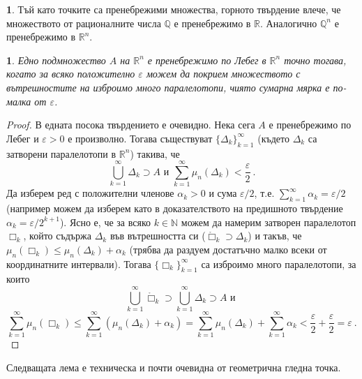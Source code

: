 \documentclass[11pt]{article}
\numberwithin{equation}{section}
\numberwithin{figure}{section}
\numberwithin{table}{section}
\theoremstyle{plain}
\theoremstyle{definition}
\theoremstyle{remark}
\theoremstyle{definition}
\theoremstyle{remark}
\theoremstyle{plain}
\theoremstyle{definition}
\theoremstyle{definition}
\newtheorem{example}[thm]{\protect\examplename}
\theoremstyle{plain}
\theoremstyle{plain}
\newtheorem{prop}[thm]{\protect\propositionname}
\theoremstyle{plain}
\theoremstyle{definition}
\theoremstyle{plain}
\providecommand{\examplename}{Пример}
\providecommand{\propositionname}{Твърдение}
\newcommand*{\R}{\mathbb{R}}
\newcommand*{\N}{\mathbb{N}}
\newcommand*{\Q}{\mathbb{Q}}
\begin{document}
\bigskip

\begin{example}
Тъй като точките са пренебрежими множества, горното твърдение влече, че множеството от рационалните числа $\Q$ е пренебрежимо в $\R$. Аналогично $\Q^n$ е пренебрежимо в $\R^n$.
\end{example}

\begin{prop}\label{negligibleinteriors}
Едно подмножество $A$ на $\R^n$ е пренебрежимо по Лебег в $\R^n$ точно тогава, когато за всяко положително $\varepsilon$ можем да покрием множеството с вътрешностите на изброимо много паралелотопи, чиято сумарна мярка е по-малка от $\varepsilon$.
\end{prop}
\begin{proof}
В едната посока твърдението е очевидно. Нека сега $A$ е пренебрежимо по Лебег и $\varepsilon >0$ е произволно. Тогава съществуват $\{\Delta_k \}_{k=1}^\infty$ (където $\Delta_k$ са затворени паралелотопи в $\R^n$) такива, че $$\bigcup_{k=1}^\infty \Delta_k \supset A  \mbox{ и } \sum_{k=1}^\infty \mu_n(\Delta_k)<\frac{\varepsilon}{2} \ .$$
Да изберем ред с положителни членове $\alpha_k>0$ и сума $\varepsilon/2$, т.е. $\sum_{k=1}^\infty \alpha_k=\varepsilon/2$ (например можем да изберем като в доказателството на предишното твърдение $\alpha_k=\varepsilon/2^{k+1}$). Ясно е, че за всяко $k\in \N$ можем да намерим затворен паралелотоп $\Box_k$, който съдържа $\Delta_k$ във вътрешността си ($\mathring \Box_k \supset\Delta_k$) и такъв, че $\mu_n(\Box_k)\le \mu_n(\Delta_k)+\alpha_k$ (трябва да раздуем достатъчно малко всеки от координатните интервали). Тогава $\{\Box_k \}_{k=1}^\infty$ са изброимо много паралелотопи, за които
$$\bigcup_{k=1}^\infty \mathring \Box_k\supset \bigcup_{k=1}^\infty \Delta_k\supset A \mbox{ и } $$
$$\sum_{k=1}^\infty \mu_n(\Box_k)\le \sum_{k=1}^\infty (\mu_n(\Delta_k)+\alpha_k) =
\sum_{k=1}^\infty \mu_n(\Delta_k) +\sum_{k=1}^\infty \alpha_k <\frac{\varepsilon}{2}+\frac{\varepsilon}{2}=\varepsilon \ .$$
\end{proof}

Следващата лема е техническа и почти очевидна от геометрична гледна точка.
\end{document}
